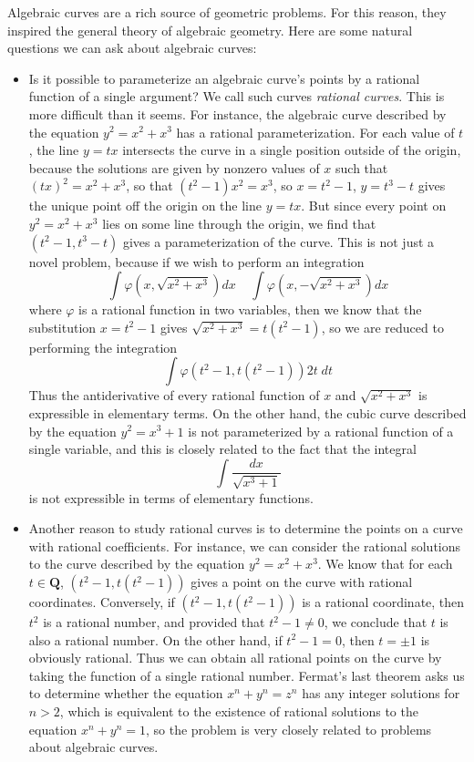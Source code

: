 Algebraic curves are a rich source of geometric problems. For this reason, they inspired the general theory of algebraic geometry. Here are some natural questions we can ask about algebraic curves:
%
\begin{itemize}
    \item Is it possible to parameterize an algebraic curve's points by a rational function of a single argument? We call such curves \emph{rational curves}. This is more difficult than it seems. For instance, the algebraic curve described by the equation $y^2 = x^2 + x^3$ has a rational parameterization. For each value of $t$, the line $y = tx$ intersects the curve in a single position outside of the origin, because the solutions are given by nonzero values of $x$ such that $(tx)^2 = x^2 + x^3$, so that $(t^2 - 1)x^2 = x^3$, so $x = t^2 - 1$, $y = t^3 - t$ gives the unique point off the origin on the line $y = tx$. But since every point on $y^2 = x^2 + x^3$ lies on some line through the origin, we find that $(t^2 - 1, t^3 - t)$ gives a parameterization of the curve. This is not just a novel problem, because if we wish to perform an integration
    \[ \int \varphi \left(x, \sqrt{x^2 + x^3} \right) dx\ \ \ \ \ \int \varphi \left( x, - \sqrt{x^2 + x^3} \right) dx \]
    where $\varphi$ is a rational function in two variables, then we know that the substitution $x = t^2 - 1$ gives $\sqrt{x^2 + x^3} = t(t^2 - 1)$, so we are reduced to performing the integration
    \[ \int \varphi(t^2 - 1, t(t^2 - 1)) 2t\; dt \]
    Thus the antiderivative of every rational function of $x$ and $\sqrt{x^2 + x^3}$ is expressible in elementary terms. On the other hand, the cubic curve described by the equation $y^2 = x^3 + 1$ is not parameterized by a rational function of a single variable, and this is closely related to the fact that the integral
    \[ \int \frac{dx}{\sqrt{x^3 + 1}} \]
    is not expressible in terms of elementary functions.

    \item Another reason to study rational curves is to determine the points on a curve with rational coefficients. For instance, we can consider the rational solutions to the curve described by the equation $y^2 = x^2 + x^3$. We know that for each $t \in \mathbf{Q}$, $(t^2 - 1, t(t^2 - 1))$ gives a point on the curve with rational coordinates. Conversely, if $(t^2 - 1, t(t^2 - 1))$ is a rational coordinate, then $t^2$ is a rational number, and provided that $t^2 - 1 \neq 0$, we conclude that $t$ is also a rational number. On the other hand, if $t^2 - 1 = 0$, then $t = \pm 1$ is obviously rational. Thus we can obtain all rational points on the curve by taking the function of a single rational number. Fermat's last theorem asks us to determine whether the equation $x^n + y^n = z^n$ has any integer solutions for $n > 2$, which is equivalent to the existence of rational solutions to the equation $x^n + y^n = 1$, so the problem is very closely related to problems about algebraic curves.


\end{itemize}
